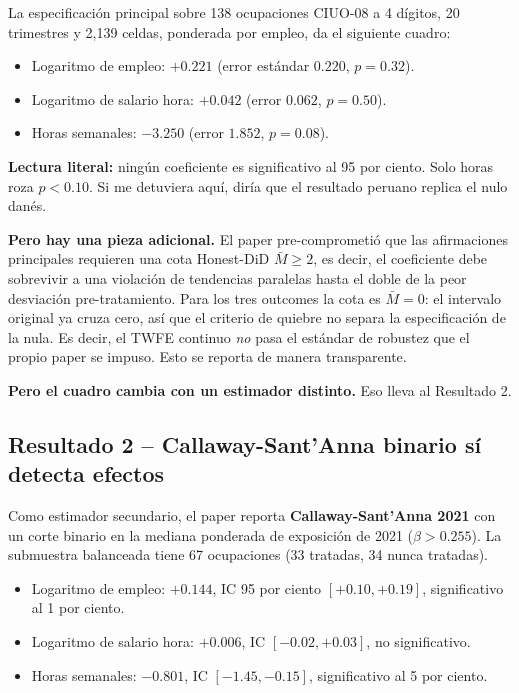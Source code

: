 \documentclass[12pt]{article}
\begin{document}
La especificación principal sobre 138 ocupaciones CIUO-08 a 4 dígitos, 20 trimestres y 2,139 celdas, ponderada por empleo, da el siguiente cuadro:

\begin{itemize}
  \item Logaritmo de empleo: $+0.221$ (error estándar $0.220$, $p = 0.32$).
  \item Logaritmo de salario hora: $+0.042$ (error $0.062$, $p = 0.50$).
  \item Horas semanales: $-3.250$ (error $1.852$, $p = 0.08$).
\end{itemize}

\textbf{Lectura literal:} ningún coeficiente es significativo al 95 por ciento. Solo horas roza $p < 0.10$. Si me detuviera aquí, diría que el resultado peruano replica el nulo danés.

\textbf{Pero hay una pieza adicional.} El paper pre-comprometió que las afirmaciones principales requieren una cota Honest-DiD $\bar M \geq 2$, es decir, el coeficiente debe sobrevivir a una violación de tendencias paralelas hasta el doble de la peor desviación pre-tratamiento. Para los tres outcomes la cota es $\bar M = 0$: el intervalo original ya cruza cero, así que el criterio de quiebre no separa la especificación de la nula. Es decir, el TWFE continuo \emph{no} pasa el estándar de robustez que el propio paper se impuso. Esto se reporta de manera transparente.

\textbf{Pero el cuadro cambia con un estimador distinto.} Eso lleva al Resultado 2.

\subsection{Resultado 2 -- Callaway-Sant'Anna binario sí detecta efectos}

Como estimador secundario, el paper reporta \textbf{Callaway-Sant'Anna 2021} con un corte binario en la mediana ponderada de exposición de 2021 ($\beta > 0.255$). La submuestra balanceada tiene 67 ocupaciones (33 tratadas, 34 nunca tratadas).

\begin{itemize}
  \item Logaritmo de empleo: $+0.144$, IC 95 por ciento $[+0.10, +0.19]$, significativo al 1 por ciento.
  \item Logaritmo de salario hora: $+0.006$, IC $[-0.02, +0.03]$, no significativo.
  \item Horas semanales: $-0.801$, IC $[-1.45, -0.15]$, significativo al 5 por ciento.
\end{itemize}
\end{document}
